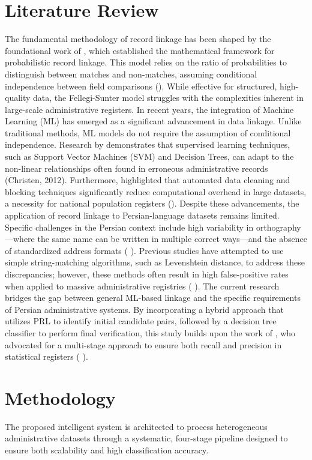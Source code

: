 \documentclass[twoside]{article}
\begin{document}
\section{Literature Review}
The fundamental methodology of record linkage has been shaped by the foundational work of \cite{Fellegi:1969}, which established the mathematical framework for probabilistic record linkage. This model relies on the ratio of probabilities to distinguish between matches and non-matches, assuming conditional independence between field comparisons (\cite{Fellegi:1969}). While effective for structured, high-quality data, the Fellegi-Sunter model struggles with the complexities inherent in large-scale administrative registers.
In recent years, the integration of Machine Learning (ML) has emerged as a significant advancement in data linkage. Unlike traditional methods, ML models do not require the assumption of conditional independence. Research by \cite{Christen:2012} demonstrates that supervised learning techniques, such as Support Vector Machines (SVM) and Decision Trees, can adapt to the non-linear relationships often found in erroneous administrative records (Christen, 2012). Furthermore, \cite{Mahdavi:2020} highlighted that automated data cleaning and blocking techniques significantly reduce computational overhead in large datasets, a necessity for national population registers (\cite{Mahdavi:2020}).
Despite these advancements, the application of record linkage to Persian-language datasets remains limited. Specific challenges in the Persian context include high variability in orthography—where the same name can be written in multiple correct ways—and the absence of standardized address formats ( \cite{karimi and Rezvani:2021}). Previous studies have attempted to use simple string-matching algorithms, such as Levenshtein distance, to address these discrepancies; however, these methods often result in high false-positive rates when applied to massive administrative registries ( \cite{karimi and Rezvani:2021}).
The current research bridges the gap between general ML-based linkage and the specific requirements of Persian administrative systems. By incorporating a hybrid approach that utilizes PRL to identify initial candidate pairs, followed by a decision tree classifier to perform final verification, this study builds upon the work of \cite{Herzog:2007}, who advocated for a multi-stage approach to ensure both recall and precision in statistical registers ( \cite{Herzog:2007}).

\section{Methodology}
The proposed intelligent system is architected to process heterogeneous administrative datasets through a systematic, four-stage pipeline designed to ensure both scalability and high classification accuracy.
\end{document}
